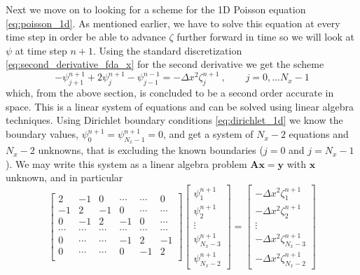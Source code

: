 \documentclass[12pt]{article}
\numberwithin{figure}{section}
\numberwithin{table}{section}
\begin{document}
\noindent Next we move on to looking for a scheme for the 1D Poisson equation \eqref{eq:poisson_1d}. As mentioned earlier, we have to solve this equation at every time step in order be able to advance $\zeta$ further forward in time so we will look at $\psi$ at time step $n+1$. Using the standard discretization \eqref{eq:second_derivative_fda_x} for the second derivative we get the scheme
\begin{equation}
	-\psi_{j+1}^{n+1}+2\psi_j^{n+1}-\psi_{j-1}^{n-1}=-\Delta x^2\zeta_j^{n+1} \ , \qquad j=0,\dots N_x-1 \label{eq:poisson_1d_discretized}
\end{equation}
which, from the above section, is concluded to be a second order accurate in space. This is a linear system of equations and can be solved using linear algebra techniques. Using Dirichlet boundary conditions \eqref{eq:dirichlet_1d} we know the boundary values, $\psi_0^{n+1}=\psi_{N_x-1}^{n+1}=0$, and get a system of $N_x-2$ equations and $N_x-2$ unknowns, that is excluding the known boundaries ($j=0$ and $j=N_x-1$). We may write this system as a linear algebra problem $\mathbf{A}\mathbf{x}=\mathbf{y}$ with $\mathbf{x}$ unknown, and in particular
\begin{equation}
	\begin{bmatrix}
                           2& -1& 0 &\cdots   & \cdots &0 \\
                           -1 & 2 & -1 &0 &\cdots &\cdots \\
                           0&-1 &2 & -1 & 0 & \cdots \\
                           \cdots & \cdots   & \cdots &\cdots   &\cdots & \cdots \\
                           0& \cdots   & \cdots  &-1 &2& -1 \\
                           0&\cdots    & \cdots  & 0  &-1 & 2 \\
                      \end{bmatrix}
	\begin{bmatrix}
		\psi_1^{n+1} \\
        \psi_2^{n+1} \\
        \vdots \\
        \psi_{N_x-3}^{n+1} \\
        \psi_{N_x-2}^{n+1}
	\end{bmatrix} =
    \begin{bmatrix}
		-\Delta x^2\zeta_1^{n+1} \\
        -\Delta x^2\zeta_2^{n+1} \\
        \vdots \\
        -\Delta x^2\zeta_{N_x-3}^{n+1} \\
        -\Delta x^2\zeta_{N_x-2}^{n+1}
	\end{bmatrix} \label{eq:linalg_dirichlet}
\end{equation}
\end{document}
